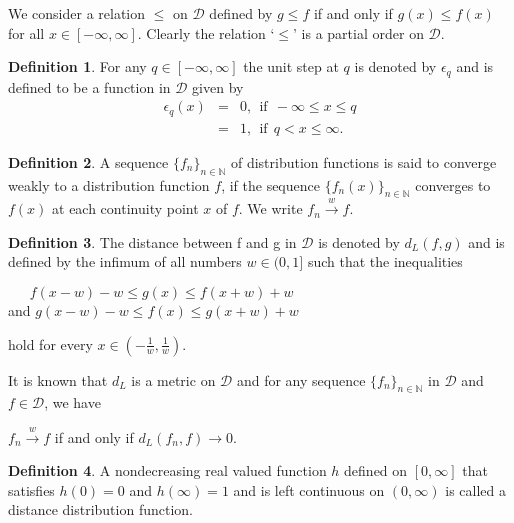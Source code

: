 \documentclass[reqno,b5paper]{amsart}
\theoremstyle{plain}
\theoremstyle{definition}
\newtheorem{defn}{Definition}[section]
\begin{document}
We consider a relation $\leq$ on $\mathcal{D}$ defined by $g \leq
f$ if and only if $g(x)\leq f(x)$ for all $x \in
[-\infty,\infty]$. Clearly the relation `$\leq$' is a partial
order on $\mathcal{D}$.
\begin{defn}
For any $q\in [-\infty, \infty ]$ the unit step at $q$ is denoted
by $\epsilon_{q}$ and is defined to be a function in $\mathcal{D}$
given by
\begin{eqnarray*}
\epsilon_{q}(x)&=&0, ~~ \text{if}~~-\infty \leq x \leq q\\
                  &=&1,~~ \text{if}~~  q < x\leq \infty.
\end{eqnarray*}
\end{defn}
\begin{defn}
A sequence $\{f_{n}\}_{n\in \mathbb{N}}$ of distribution functions
is said to converge weakly to a distribution function $f$, if the
sequence $\{f_{n}(x)\}_{n\in\mathbb{N}}$ converges to $f(x)$ at
each continuity point $x$ of $f$. We write
$f_{n}\xrightarrow{w}f$.
\end{defn}
\begin{defn}
The distance between f and g in $\mathcal{D}$ is denoted by
$d_{L}(f,g)$ and is defined by the infimum of all numbers
$w\in(0,1]$ such that the inequalities
\begin{center}
$~~~~~~~f(x-w)-w\leq g(x)\leq f(x+w)+w$ \\

and $g(x-w)-w\leq f(x)\leq g(x+w)+w$
\end{center}
hold for every $x\in(-\frac{1}{w},\frac{1}{w})$.
\end{defn}
It is known that $d_{L}$ is a metric on $\mathcal{D}$ and for any
sequence $\{f_{n}\}_{n\in\mathbb{N}}$ in $\mathcal{D}$ and
$f\in\mathcal{D}$, we have
\begin{center}
$f_{n}\xrightarrow{w}f$  if and only if $d_{L}(f_{n},f)\rightarrow
0$.
\end{center}
\begin{defn}
A nondecreasing real valued function $h$ defined on $[0,\infty]$
that satisfies $h(0)=0$ and $ h(\infty)=1$ and is left continuous
on $(0,\infty)$ is called a distance distribution function.
\end{defn}
\end{document}

